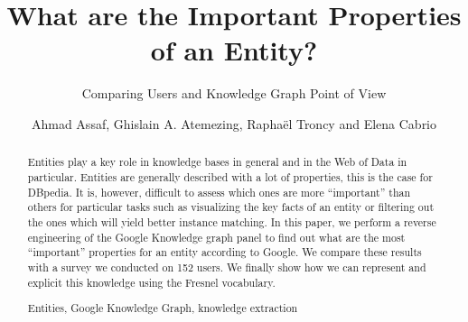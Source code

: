 \documentclass[runningheads,a4paper]{../../Util/LaTEX/llncs}
\newcommand{\keywords}[1]{\par\addvspace\baselineskip
\noindent\keywordname\enspace\ignorespaces#1}
\begin{document}
\title{What are the Important Properties of an Entity?}
\subtitle{Comparing Users and Knowledge Graph Point of View}

\author{Ahmad Assaf, Ghislain A. Atemezing, Rapha\"{e}l Troncy and Elena Cabrio }



\maketitle


\begin{abstract}
Entities play a key role in knowledge bases in general and in the Web of Data in particular. Entities are generally described with a lot of properties, this is the case for DBpedia. It is, however, difficult to assess which ones are more ``important'' than others for particular tasks such as visualizing the key facts of an entity or filtering out the ones which will yield better instance matching. In this paper, we perform a reverse engineering of the Google Knowledge graph panel to find out what are the most ``important'' properties for an entity according to Google. We compare these results with a survey we conducted on 152 users. We finally show how we can represent and explicit this knowledge using the Fresnel vocabulary.
\keywords{Entities, Google Knowledge Graph, knowledge extraction}
\end{abstract}

\end{document}
